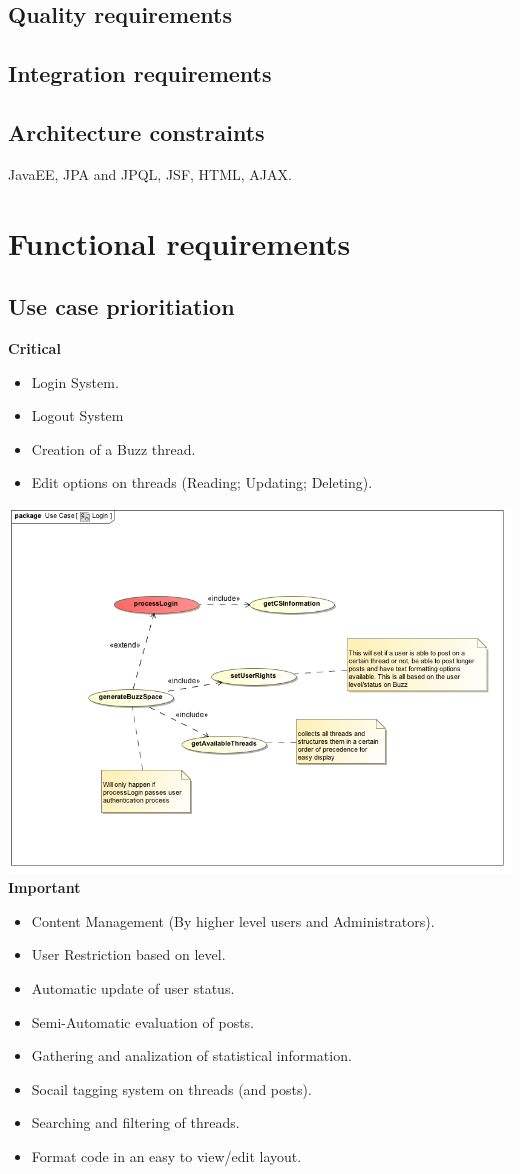\documentclass[a4paper,12pt]{report}
\begin{document}
\subsection{Quality requirements}
\subsection{Integration requirements}
\subsection{Architecture constraints}
JavaEE, JPA and JPQL, JSF, HTML,
AJAX.
\section{Functional requirements}
\subsection{Use case prioritiation}
\textbf{Critical} 
\begin{itemize}
  \item Login System.  
  \item Logout System
  \item Creation of a Buzz thread.
  \item Edit options on threads (Reading; Updating; Deleting).
\end{itemize}
  \includegraphics[width=1\textwidth]{../Functional_Requirements_DIagrams/UseCases/UseCase_Login.jpg}\\[0.4cm]  
\textbf{Important} 
\begin{itemize}
  \item Content Management (By higher level users and Administrators).
  \item User Restriction based on level.
  \item Automatic update of user status.
  \item Semi-Automatic evaluation of posts.
  \item Gathering and analization of statistical information.
  \item Socail tagging system on threads (and posts).
  \item Searching and filtering of threads.
  \item Format code in an easy to view/edit layout. 
\end{itemize}
\end{document}
